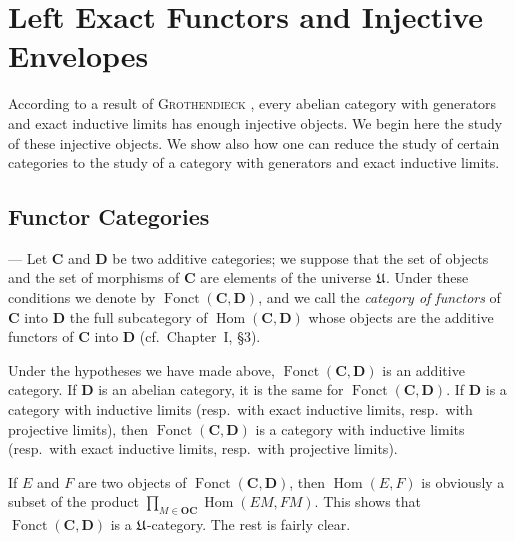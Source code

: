 \chapter{Left Exact Functors and Injective Envelopes}

According to a result of \textsc{Grothendieck} \cite{grothendieck-1}, every abelian category
with generators and exact inductive limits has enough injective objects. We
begin here the study of these injective objects. We show also how one can
reduce the study of certain categories to the study of a category with
generators and exact inductive limits.

\section{Functor Categories}
--- Let $\mathbf{C}$ and $\mathbf{D}$ be two additive categories; we suppose
that the set of objects and the set of morphisms of $\mathbf{C}$ are elements
of the universe $\mathfrak{U}$. Under these conditions we denote by
$\operatorname{Fonct}(\mathbf{C},\mathbf{D})$, and we call the
\emph{category of functors} of $\mathbf{C}$ into $\mathbf{D}$ the full
subcategory of $\operatorname{Hom}(\mathbf{C},\mathbf{D})$ whose objects are
the additive functors of $\mathbf{C}$ into $\mathbf{D}$ (cf.\
Chapter~I, \S3).

\begin{proposition}
Under the hypotheses we have made above, $\operatorname{Fonct}(\mathbf{C},\mathbf{D})$
is an additive category. If $\mathbf{D}$ is an abelian category, it is the same
for $\operatorname{Fonct}(\mathbf{C},\mathbf{D})$. If $\mathbf{D}$ is a category
with inductive limits (resp.\ with exact inductive limits, resp.\ with
projective limits), then $\operatorname{Fonct}(\mathbf{C},\mathbf{D})$ is a
category with inductive limits (resp.\ with exact inductive limits, resp.\
with projective limits).
\end{proposition}

If $E$ and $F$ are two objects of $\operatorname{Fonct}(\mathbf{C},\mathbf{D})$,
then $\operatorname{Hom}(E,F)$ is obviously a subset of the product
$\prod_{M\in\mathbf{OC}}\operatorname{Hom}(EM,FM)$. This shows that
$\operatorname{Fonct}(\mathbf{C},\mathbf{D})$ is a $\mathfrak{U}$-category. The rest
is fairly clear.

